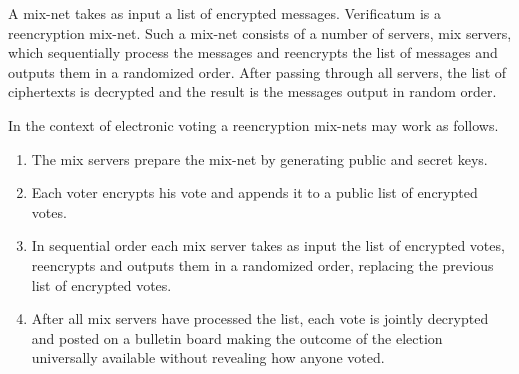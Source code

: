  A mix-net takes as input a list of encrypted messages. Verificatum is
 a reencryption mix-net. Such a mix-net consists of a number of
 servers, mix servers, which sequentially process the messages and
 reencrypts the list of messages and outputs them in a randomized
 order. After passing through all servers, the list of ciphertexts is
 decrypted and the result is the messages output in random order.

In the context of electronic voting a reencryption mix-nets may work
as follows.
\begin{enumerate}
\item The mix servers prepare the mix-net by generating public and
  secret keys.
\item Each voter encrypts his vote and appends it to a public list of
  encrypted votes.
\item In sequential order each mix server takes as input the list of
  encrypted votes, reencrypts and outputs them in a randomized order,
  replacing the previous list of encrypted votes.
\item After all mix servers have processed the list, each vote is
  jointly decrypted and posted on a bulletin board making the outcome
  of the election universally available without revealing how anyone
  voted.
\end{enumerate}

\begin{center}
\end{center}

